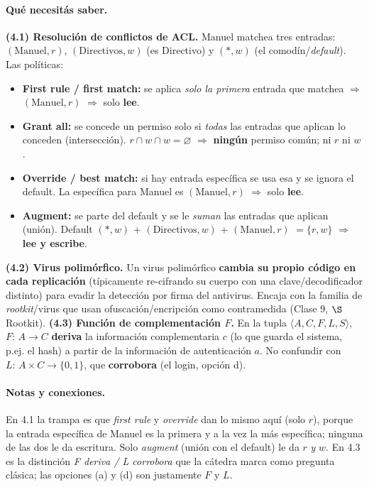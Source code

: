 \paragraph{Qué necesitás saber.}
\textbf{(4.1) Resolución de conflictos de ACL.} Manuel matchea tres entradas: $(\text{Manuel},r)$,
$(\text{Directivos},w)$ (es Directivo) y $(*,w)$ (el comodín/\emph{default}). Las políticas:
\begin{itemize}
  \item \textbf{First rule / first match:} se aplica \emph{solo la primera} entrada que matchea
        $\Rightarrow$ $(\text{Manuel},r)$ $\Rightarrow$ solo \textbf{lee}.
  \item \textbf{Grant all:} se concede un permiso solo si \emph{todas} las entradas que aplican
        lo conceden (intersección). $r \cap w \cap w = \varnothing$ $\Rightarrow$ \textbf{ningún}
        permiso común; ni $r$ ni $w$.
  \item \textbf{Override / best match:} si hay entrada específica se usa esa y se ignora el
        default. La específica para Manuel es $(\text{Manuel},r)$ $\Rightarrow$ solo \textbf{lee}.
  \item \textbf{Augment:} se parte del default y se le \emph{suman} las entradas que aplican
        (unión). Default $(*,w)$ + $(\text{Directivos},w)$ + $(\text{Manuel},r)$
        $= \{r,w\}$ $\Rightarrow$ \textbf{lee y escribe}.
\end{itemize}
\textbf{(4.2) Virus polimórfico.} Un virus polimórfico \textbf{cambia su propio código en cada
replicación} (típicamente re-cifrando su cuerpo con una clave/decodificador distinto) para
evadir la detección por firma del antivirus. Encaja con la familia de \emph{rootkit}/virus que
usan ofuscación/encripción como contramedida (Clase 9, $\S$ Rootkit).
\textbf{(4.3) Función de complementación $F$.} En la tupla $\langle A,C,F,L,S\rangle$,
$F:\,A\to C$ \textbf{deriva} la información complementaria $c$ (lo que guarda el sistema, p.ej.
el hash) a partir de la información de autenticación $a$. No confundir con $L:\,A\times C\to\{0,1\}$,
que \textbf{corrobora} (el login, opción d).

\paragraph{Notas y conexiones.}
En 4.1 la trampa es que \emph{first rule} y \emph{override} dan lo mismo aquí (solo $r$), porque
la entrada específica de Manuel es la primera y a la vez la más específica; ninguna de las dos
le da escritura. Solo \emph{augment} (unión con el default) le da $r$ \emph{y} $w$. En 4.3 es la
distinción \emph{F deriva / L corrobora} que la cátedra marca como pregunta clásica; las
opciones (a) y (d) son justamente $F$ y $L$.

